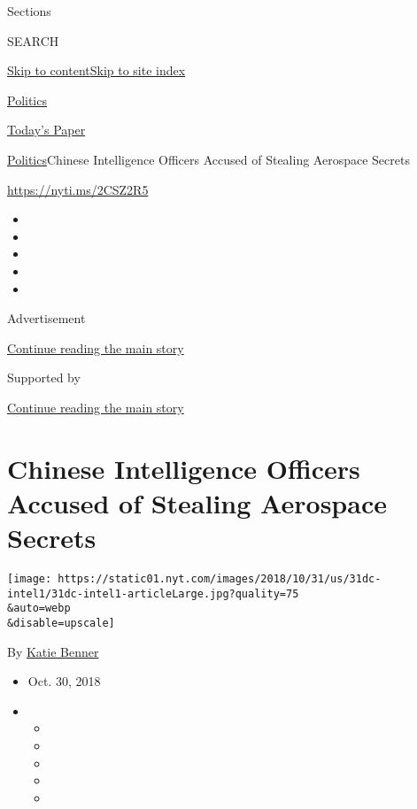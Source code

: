 Sections

SEARCH

\protect\hyperlink{site-content}{Skip to
content}\protect\hyperlink{site-index}{Skip to site index}

\href{https://www.nytimes.com/section/politics}{Politics}

\href{https://myaccount.nytimes.com/auth/login?response_type=cookie\&client_id=vi}{}

\href{https://www.nytimes.com/section/todayspaper}{Today's Paper}

\href{/section/politics}{Politics}\textbar{}Chinese Intelligence
Officers Accused of Stealing Aerospace Secrets

\url{https://nyti.ms/2CSZ2R5}

\begin{itemize}
\item
\item
\item
\item
\item
\end{itemize}

Advertisement

\protect\hyperlink{after-top}{Continue reading the main story}

Supported by

\protect\hyperlink{after-sponsor}{Continue reading the main story}

\hypertarget{chinese-intelligence-officers-accused-of-stealing-aerospace-secrets}{%
\section{Chinese Intelligence Officers Accused of Stealing Aerospace
Secrets}\label{chinese-intelligence-officers-accused-of-stealing-aerospace-secrets}}

\texttt{[image: https://static01.nyt.com/images/2018/10/31/us/31dc-intel1/31dc-intel1-articleLarge.jpg?quality=75\\\&auto=webp\\\&disable=upscale]}

By \href{https://www.nytimes.com/by/katie-benner}{Katie Benner}

\begin{itemize}
\item
  Oct. 30, 2018
\item
  \begin{itemize}
  \item
  \item
  \item
  \item
  \item
  \end{itemize}
\end{itemize}

